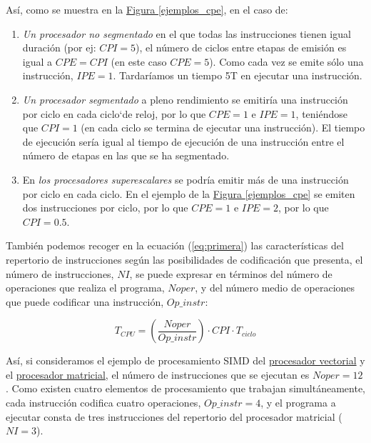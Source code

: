 \documentclass[10pt,a4paper,spanish]{report}
\begin{document}
Así, como se muestra en la \hyperref[ejemplos_cpe]{Figura \ref*{ejemplos_cpe}}, en el caso de:
\begin{enumerate}[\color{azul}{\bf $\heartsuit$}]
\label{segmentado_tipos}
  \item \textit{\textcolor[rgb]{0.2,0.4,0.8}{Un procesador no segmentado}} en el que todas las instrucciones tienen igual duración (por ej: $CPI = 5$), el número de ciclos entre etapas de emisión es igual a $CPE = CPI$ (en este caso $CPE = 5$). Como cada vez se emite sólo una instrucción, $IPE = 1$. Tardaríamos un tiempo 5T en ejecutar una instrucción.
  \item \textit{\textcolor[rgb]{0.2,0.4,0.8}{Un procesador segmentado}} a pleno rendimiento se emitiría una instrucción por ciclo en cada ciclo`de reloj, por lo que $CPE = 1$ e $IPE = 1$, teniéndose que $CPI = 1$ (en cada ciclo se termina de ejecutar una instrucción). El tiempo de ejecución sería igual al tiempo de ejecución de una instrucción entre el número de etapas en las que se ha segmentado. 
  \item En \textit{\textcolor[rgb]{0.2,0.4,0.8}{los procesadores superescalares}} se podría emitir más de una instrucción por ciclo en cada ciclo. En el ejemplo de la \hyperref[ejemplos_cpe]{Figura \ref*{ejemplos_cpe}} se emiten dos instrucciones por ciclo, por lo que $CPE = 1$ e $IPE = 2$, por lo que $CPI = 0.5$. %
\end{enumerate}

También podemos recoger en la ecuación (\ref{eq:primera}) las características del repertorio de instrucciones según las posibilidades de codificación que presenta, el número de instrucciones, $NI$, se puede expresar en términos del número de operaciones que realiza el programa, $Noper$, y del número medio de operaciones que puede codificar una instrucción, $Op\_instr$:

\begin{equation}
\label{eq:quinta}
  T_{CPU}=(\frac{Noper}{Op\_instr}) \cdot CPI \cdot T_{ciclo}
\end{equation}

Así, si consideramos el ejemplo de procesamiento SIMD del \hyperref[procesador_vectorial]{procesador vectorial} y el \hyperref[procesador_matricial]{procesador matricial}, el número de instrucciones que se ejecutan es $Noper = 12$. Como existen cuatro elementos de procesamiento que trabajan simultáneamente, cada instrucción codifica cuatro operaciones, $Op\_instr=4$, y el programa a ejecutar consta de tres instrucciones del repertorio del procesador matricial ($NI = 3$).
\end{document}
